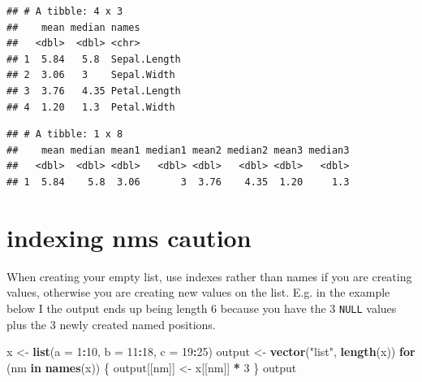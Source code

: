 \documentclass[]{book}
\newenvironment{Shaded}{\begin{snugshade}}{\end{snugshade}}
\newcommand{\ControlFlowTok}[1]{\textcolor[rgb]{0.13,0.29,0.53}{\textbf{#1}}}
\newcommand{\DataTypeTok}[1]{\textcolor[rgb]{0.13,0.29,0.53}{#1}}
\newcommand{\DecValTok}[1]{\textcolor[rgb]{0.00,0.00,0.81}{#1}}
\newcommand{\KeywordTok}[1]{\textcolor[rgb]{0.13,0.29,0.53}{\textbf{#1}}}
\newcommand{\NormalTok}[1]{#1}
\newcommand{\OperatorTok}[1]{\textcolor[rgb]{0.81,0.36,0.00}{\textbf{#1}}}
\newcommand{\StringTok}[1]{\textcolor[rgb]{0.31,0.60,0.02}{#1}}
\theoremstyle{definition}
\theoremstyle{definition}
\theoremstyle{definition}
\theoremstyle{remark}
\begin{document}
\begin{verbatim}
## # A tibble: 4 x 3
##    mean median names       
##   <dbl>  <dbl> <chr>       
## 1  5.84   5.8  Sepal.Length
## 2  3.06   3    Sepal.Width 
## 3  3.76   4.35 Petal.Length
## 4  1.20   1.3  Petal.Width
\end{verbatim}

\begin{Shaded}
\end{Shaded}

\begin{verbatim}
## # A tibble: 1 x 8
##    mean median mean1 median1 mean2 median2 mean3 median3
##   <dbl>  <dbl> <dbl>   <dbl> <dbl>   <dbl> <dbl>   <dbl>
## 1  5.84    5.8  3.06       3  3.76    4.35  1.20     1.3
\end{verbatim}

\hypertarget{indexing-nms-caution}{%
\section{indexing nms caution}\label{indexing-nms-caution}}

When creating your empty list, use indexes rather than names if you are
creating values, otherwise you are creating new values on the list. E.g.
in the example below I the output ends up being length 6 because you
have the 3 \texttt{NULL} values plus the 3 newly created named
positions.

\begin{Shaded}
\begin{Highlighting}[]
\NormalTok{x <-}\StringTok{ }\KeywordTok{list}\NormalTok{(}\DataTypeTok{a =} \DecValTok{1}\OperatorTok{:}\DecValTok{10}\NormalTok{, }\DataTypeTok{b =} \DecValTok{11}\OperatorTok{:}\DecValTok{18}\NormalTok{, }\DataTypeTok{c =} \DecValTok{19}\OperatorTok{:}\DecValTok{25}\NormalTok{)}
\NormalTok{output <-}\StringTok{ }\KeywordTok{vector}\NormalTok{(}\StringTok{"list"}\NormalTok{, }\KeywordTok{length}\NormalTok{(x))}
\ControlFlowTok{for}\NormalTok{ (nm }\ControlFlowTok{in} \KeywordTok{names}\NormalTok{(x)) \{}
\NormalTok{  output[[nm]] <-}\StringTok{ }\NormalTok{x[[nm]] }\OperatorTok{*}\StringTok{ }\DecValTok{3}
\NormalTok{\}}
\NormalTok{output}
\end{Highlighting}
\end{Shaded}
\end{document}
